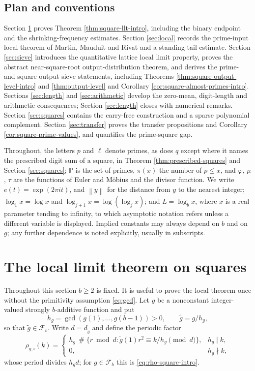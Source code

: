 \documentclass[11pt,reqno]{amsart}
\theoremstyle{plain}
\theoremstyle{definition}
\newcommand{\Pp}{\mathbb{P}}
\newcommand{\ee}[1]{e\!\left(#1\right)}
\newcommand{\1}{\mathbf 1}
\newcommand{\norm}[1]{\left\lVert #1\right\rVert}
\DeclareMathOperator{\Card}{\#}
\begin{document}
\subsection{Plan and conventions}
Section \ref{sec:square-llt} proves Theorem \ref{thm:square-llt-intro}, including the binary endpoint and the shrinking-frequency estimates. Section \ref{sec:local} records the prime-input local theorem of Martin, Mauduit and Rivat and a standing tail estimate. Section \ref{sec:sieve} introduces the quantitative lattice local limit property, proves the abstract near-square-root output-distribution theorem, and derives the prime- and square-output sieve statements, including Theorems \ref{thm:square-output-level-intro} and \ref{thm:output-level} and Corollary \ref{cor:square-almost-primes-intro}. Sections \ref{sec:length} and \ref{sec:arithmetic} develop the zero-mean, digit-length and arithmetic consequences; Section \ref{sec:length} closes with numerical remarks. Section \ref{sec:squares} contains the carry-free construction and a sparse polynomial complement. Section \ref{sec:transfer} proves the transfer propositions and Corollary \ref{cor:square-prime-values}, and quantifies the prime-square gap.

Throughout, the letters $p$ and $\ell$ denote primes, as does $q$ except where it names the prescribed digit sum of a square, in Theorem \ref{thm:prescribed-squares} and Section \ref{sec:squares}; $\Pp$ is the set of primes, $\pi(x)$ the number of $p\le x$, and $\varphi$, $\mu$, $\tau$ are the functions of Euler and M\"obius and the divisor function. We write $\ee{t}=\exp(2\pi it)$, and $\norm{y}$ for the distance from $y$ to the nearest integer; $\log_1x=\log x$ and $\log_{j+1}x=\log(\log_jx)$; and $L=\log_bx$, where $x$ is a real parameter tending to infinity, to which asymptotic notation refers unless a different variable is displayed. Implied constants may always depend on $b$ and on $g$; any further dependence is noted explicitly, usually in subscripts.

\section{The local limit theorem on squares}\label{sec:square-llt}

Throughout this section $b\ge2$ is fixed. It is useful to prove the local theorem once without the primitivity assumption \eqref{eq:gcd}. Let $g$ be a nonconstant integer-valued strongly $b$-additive function and put
\begin{equation}\label{eq:hg-square}
 h_g=\gcd(g(1),\ldots,g(b-1))>0,\qquad \widetilde g=g/h_g,
\end{equation}
so that $\widetilde g\in\mathcal F_b$. Write $d=d_{\widetilde g}$ and define the periodic factor
\begin{equation}\label{eq:rho-square-general}
 \rho_{g,\square}(k)=
 \begin{cases}
 h_g\,\Card\{r\bmod d:\widetilde g(1)r^2\equiv k/h_g\pmod d\},&h_g\mid k,\\[3pt]
 0,&h_g\nmid k,
 \end{cases}
\end{equation}
whose period divides $h_gd$; for $g\in\mathcal F_b$ this is \eqref{eq:rho-square-intro}.
\end{document}
